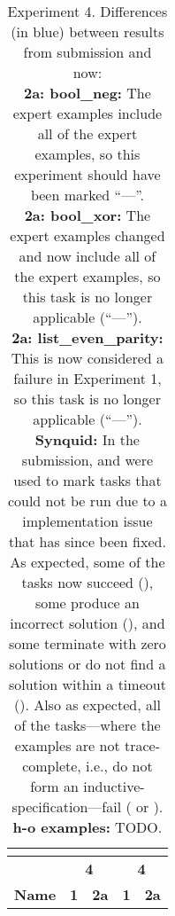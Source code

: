\begin{table}

\experimentTableSize

\begin{tabular}{l|cccc}
& \multicolumn{2}{c}{\textbf{\leon{}}}
& \multicolumn{2}{c}{\textbf{\synquid{}}} \\\hline
& \multicolumn{2}{c}{\textbf{4}}
& \multicolumn{2}{c}{\textbf{4}} \\\hline
\textbf{Name} &
\textbf{1} & \textbf{2a} &
\textbf{1} & \textbf{2a} \\

\end{tabular}

\vspace{0.10in}

\caption{Experiment 4.
%
Differences (in blue) between results from submission and now:
%
\experimentCaptionSize
%
\\[3pt]
%
\textbf{2a: bool\_neg:} The \snsMyth{} expert examples include all of the
\myth{} expert examples, so this experiment should have been marked ``---''.
%
\\[3pt]
%
\textbf{2a: bool\_xor:} The \snsMyth{} expert examples changed and now include
all of the \myth{} expert examples, so this task is no longer applicable
(``---'').
%
\\[3pt]
%
\textbf{2a: list\_even\_parity:} This is now considered a failure in Experiment
1, so this task is no longer applicable (``---'').
%
\\[3pt]
%
\textbf{Synquid:} In the submission, \synquidDatatypeAxioms{} and
\synquidNotTraceComplete{} were used to mark tasks that could not be run due to
a \synquid{} implementation issue that has since been fixed. As expected, some
of the \synquidDatatypeAxioms{} tasks now succeed (\leonquidCorrectNoPhantom{}),
some produce an incorrect solution (\leonquidIncorrect{}), and some terminate
with zero solutions or do not find a solution within a timeout
(\leonquidError{}). Also as expected, all of the \synquidNotTraceComplete{}
tasks---where the examples are not trace-complete, i.e., do not form an
inductive- specification---fail (\leonquidIncorrect{} or \leonquidError{}).
%
\\[3pt]
%
\textbf{h-o examples:} TODO.
%
}

\end{table}
